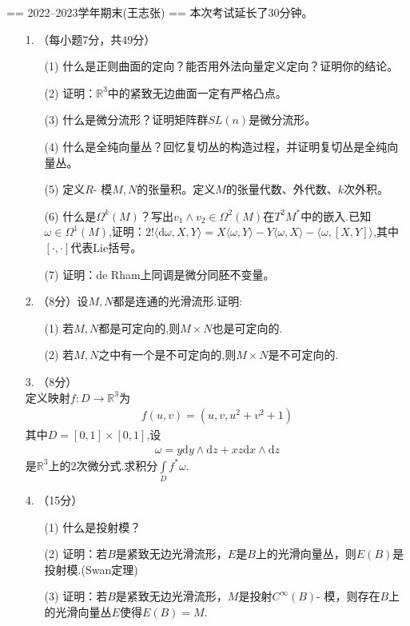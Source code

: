 == 2022--2023学年期末(王志张) ==
\qquad 本次考试延长了30分钟。
\begin{itemize}
    \item[1.]
    （每小题7分，共49分）
    \begin{enumerate}
        \item[(1)]
        什么是正则曲面的定向？能否用外法向量定义定向？证明你的结论。
        \item[(2)]
        证明：$\mathbb{R}^3$中的紧致无边曲面一定有严格凸点。
        \item[(3)]
        什么是微分流形？证明矩阵群$SL(n)$是微分流形。
        \item[(4)]
        什么是全纯向量丛？回忆复切丛的构造过程，并证明复切丛是全纯向量丛。
        \item[(5)]
        定义$R$- 模$M,N$的张量积。定义$M$的张量代数、外代数、$k$次外积。
        \item[(6)]
        什么是$\Omega^k(M)$？写出$v_1\wedge v_2\in \Omega^2(M)$在$T^2M^*$中的嵌入.已知$\omega\in \Omega^1(M)$,证明：$2!\langle \mathrm{d}\omega,X,Y\rangle = X\langle \omega,Y \rangle - Y\langle \omega,X \rangle -\langle \omega,[X,Y] \rangle$,其中$[\cdot,\cdot]$代表Lie括号。
        \item[(7)]
        证明：de Rham上同调是微分同胚不变量。
    \end{enumerate}
    
    \item[2.]
    （8分）设$M,N$都是连通的光滑流形.证明:
        \begin{enumerate}
        \item[(1)]若$M,N$都是可定向的,则$M \times N$也是可定向的.
        \item[(2)]若$M,N$之中有一个是不可定向的,则$M \times N$是不可定向的.
    \end{enumerate}

    \item[3.]
    （8分）\\
    定义映射$f:D\to \mathbb{R}^3$为
    \begin{align}
        f(u,v)=(u,v,u^2+v^2+1)
    \end{align}
    其中$D=[0,1]\times [0,1]$,设
    \begin{align}
        \omega = y\mathrm{d}y\wedge \mathrm{d}z +xz \mathrm{d}x \wedge \mathrm{d}z
    \end{align}
    是$\mathbb{R}^3$上的$2$次微分式.求积分$\int\limits_D f^* \omega.$
    
    \item[4.]
    （15分）
    \begin{enumerate}
        \item[(1)]
        什么是投射模？
        \item[(2)]
        证明：若$B$是紧致无边光滑流形，$E$是$B$上的光滑向量丛，则$E(B)$是投射模.(Swan定理)
        \item[(3)]
        证明：若$B$是紧致无边光滑流形，$M$是投射$C^{\infty} (B)$- 模，则存在$B$上的光滑向量丛$E$使得$E(B)=M$.
    \end{enumerate}


\end{itemize}
